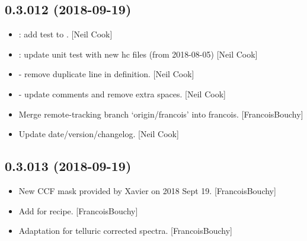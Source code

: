 \documentclass[a4paper,10pt,english]{report}
\begin{document}
\subsection{0.3.012 (2018-09-19)}
\label{\detokenize{misc/changelog:id317}}\begin{itemize}
\item {} 
: add  test to . {[}Neil Cook{]}

\item {} 
: update unit test with new hc files (from 2018-08-05) {[}Neil
Cook{]}

\item {} 
 - remove duplicate line in  definition.
{[}Neil Cook{]}

\item {} 
 - update comments and remove extra spaces.
{[}Neil Cook{]}

\item {} 
Merge remote-tracking branch ‘origin/francois’ into francois.
{[}FrancoisBouchy{]}

\item {} 
Update date/version/changelog. {[}Neil Cook{]}

\end{itemize}


\subsection{0.3.013 (2018-09-19)}
\label{\detokenize{misc/changelog:id318}}\begin{itemize}
\item {} 
New CCF mask provided by Xavier on 2018 Sept 19. {[}FrancoisBouchy{]}

\item {} 
Add  for  recipe. {[}FrancoisBouchy{]}

\item {} 
Adaptation for telluric corrected spectra. {[}FrancoisBouchy{]}

\end{itemize}
\end{document}
